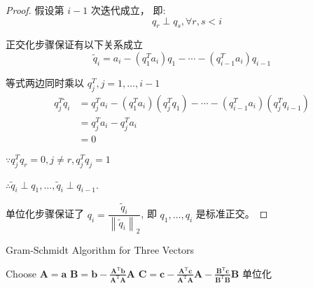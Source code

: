\begin{proof}
    假设第 $ i-1 $ 次迭代成立，  即: \begin{equation} \quad q_{r} \perp q_{s}, \forall r, s<i \end{equation}

    正交化步骤保证有以下关系成立
    \begin{equation} \tilde{q}_{i}=a_{i}-\left(q_{1}^{T} a_{i}\right) q_{1}-\cdots-\left(q_{i-1}^{T} a_{i}\right) q_{i-1} \end{equation}

    等式两边同时乘以 $ q_{j}^{T}, j=1, \ldots, i-1 $
    \begin{equation} \begin{aligned} q_{j}^{T} \tilde{q}_{i} &=q_{j}^{T} a_{i}-\left(q_{1}^{T} a_{i}\right)\left(q_{j}^{T} q_{1}\right)-\cdots-\left(q_{i-1}^{T} a_{i}\right)\left(q_{j}^{T} q_{i-1}\right) \\ &=q_{j}^{T} a_{i}-q_{j}^{T} a_{i}
        \\ &=0  \end{aligned} \end{equation}

    $ \because q_{j}^{T} q_{r}=0, j \neq r, q_{j}^{T} q_{j}=1 $

     $\therefore \tilde{q}_{i} \perp q_{1}, \ldots, \tilde{q}_{i} \perp q_{i-1} $.

    单位化步骤保证了 $
    q_{i}=\dfrac{\tilde{q}_{i}}{\left\|\tilde{q}_{i}\right\|_{2}}$, 即 $ q_{1}, \ldots, q_{i} $ 是标准正交。 
\end{proof}

\begin{algorithm}[htbp]
    \caption{Gram-Schmidt Algorithm for Three Vectors}
    Choose $ \boldsymbol{A}=\boldsymbol{a} $\;
    $ \boldsymbol{B}=\boldsymbol{b}-\frac{\boldsymbol{A}^{\mathrm{T}} \boldsymbol{b}}{\boldsymbol{A}^{\mathrm{T}} \boldsymbol{A}} \boldsymbol{A} $\;
    $ \boldsymbol{C}=\boldsymbol{c}-\frac{\boldsymbol{A}^{\mathrm{T}} \boldsymbol{c}}{\boldsymbol{A}^{\mathrm{T}} \boldsymbol{A}} \boldsymbol{A}-\frac{\boldsymbol{B}^{\mathrm{T}} \boldsymbol{c}}{\boldsymbol{B}^{\mathrm{T}} \boldsymbol{B}} \boldsymbol{B}   $\;
    单位化\;
\end{algorithm}

